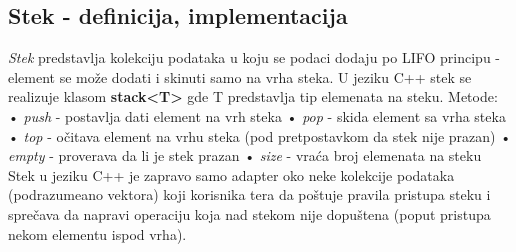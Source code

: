 \documentclass{article}
\begin{document}
\subsection{Stek - definicija, implementacija}
\textit{Stek} predstavlja kolekciju podataka u koju se podaci dodaju po LIFO principu - element se može dodati i skinuti samo na vrha steka.
U jeziku C++ stek se realizuje klasom \textbf{stack<T>} gde T predstavlja tip elemenata na steku. Metode:
\newline \hspace*{0.2cm}• \textit{push} - postavlja dati element na vrh steka
\newline \hspace*{0.2cm}• \textit{pop} - skida element sa vrha steka
\newline \hspace*{0.2cm}• \textit{top} - očitava element na vrhu steka (pod pretpostavkom da stek nije prazan)
\newline \hspace*{0.2cm}• \textit{empty} - proverava da li je stek prazan
\newline \hspace*{0.2cm}• \textit{size} - vraća broj elemenata na steku
\newline Stek u jeziku C++ je zapravo samo adapter oko neke kolekcije podataka (podrazumeano vektora) koji korisnika tera da poštuje pravila pristupa steku i sprečava da napravi operaciju koja nad stekom nije dopuštena (poput pristupa
nekom elementu ispod vrha).
\end{document}
